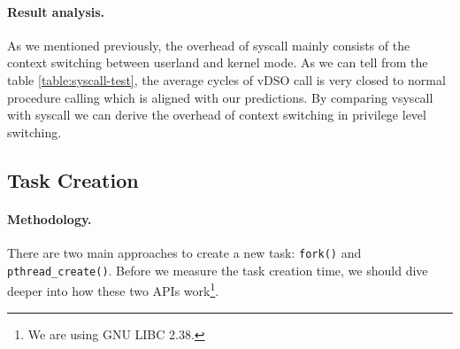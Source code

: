 \paragraph{Result analysis.} As we mentioned previously, the overhead of syscall mainly consists of the context switching between userland and kernel mode. As we can tell from the table \ref{table:syscall-test}, the average cycles of vDSO call is very closed to normal procedure calling which is aligned with our predictions. By comparing vsyscall with syscall we can derive the overhead of context switching in privilege level switching.

\subsection{Task Creation} 
\paragraph{Methodology.} There are two main approaches to create a new task: \texttt{fork()} and \texttt{pthread\_create()}. Before we measure the task creation time, we should dive deeper into how these two APIs work\footnote{We are using GNU LIBC 2.38.}.

